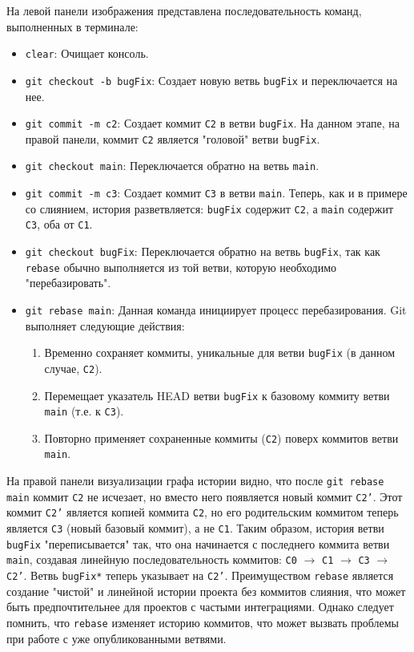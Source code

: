 \label{fig:lgb_rebase}

На левой панели изображения представлена последовательность команд, выполненных в терминале:
\begin{itemize}
    \item \texttt{clear}: Очищает консоль.
    \item \texttt{git checkout -b bugFix}: Создает новую ветвь \texttt{bugFix} и переключается на нее.
    \item \texttt{git commit -m c2}: Создает коммит \texttt{C2} в ветви \texttt{bugFix}.
    На данном этапе, на правой панели, коммит \texttt{C2} является "головой" ветви \texttt{bugFix}.
    \item \texttt{git checkout main}: Переключается обратно на ветвь \texttt{main}.
    \item \texttt{git commit -m c3}: Создает коммит \texttt{C3} в ветви \texttt{main}.
    Теперь, как и в примере со слиянием, история разветвляется: \texttt{bugFix} содержит \texttt{C2}, а \texttt{main} содержит \texttt{C3}, оба от \texttt{C1}.
    \item \texttt{git checkout bugFix}: Переключается обратно на ветвь \texttt{bugFix}, так как \texttt{rebase} обычно выполняется из той ветви, которую необходимо "перебазировать".
    \item \texttt{git rebase main}: Данная команда инициирует процесс перебазирования.
    Git выполняет следующие действия:
    \begin{enumerate}
        \item Временно сохраняет коммиты, уникальные для ветви \texttt{bugFix} (в данном случае, \texttt{C2}).
        \item Перемещает указатель HEAD ветви \texttt{bugFix} к базовому коммиту ветви \texttt{main} (т.е. к \texttt{C3}).
        \item Повторно применяет сохраненные коммиты (\texttt{C2}) поверх коммитов ветви \texttt{main}.
    \end{enumerate}
\end{itemize}
На правой панели визуализации графа истории видно, что после \texttt{git rebase main} коммит \texttt{C2} не исчезает, но вместо него появляется новый коммит \texttt{C2'}.
Этот коммит \texttt{C2'} является копией коммита \texttt{C2}, но его родительским коммитом теперь является \texttt{C3} (новый базовый коммит), а не \texttt{C1}.
Таким образом, история ветви \texttt{bugFix} "переписывается" так, что она начинается с последнего коммита ветви \texttt{main}, создавая линейную последовательность коммитов: \texttt{C0} $\rightarrow$ \texttt{C1} $\rightarrow$ \texttt{C3} $\rightarrow$ \texttt{C2'}.
Ветвь \texttt{bugFix*} теперь указывает на \texttt{C2'}.
Преимуществом \texttt{rebase} является создание "чистой" и линейной истории проекта без коммитов слияния, что может быть предпочтительнее для проектов с частыми интеграциями.
Однако следует помнить, что \texttt{rebase} изменяет историю коммитов, что может вызвать проблемы при работе с уже опубликованными ветвями.


